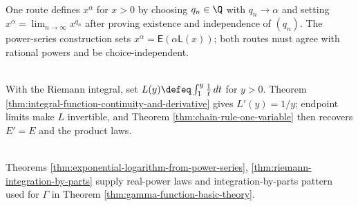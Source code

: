 \begin{perspective} \label{per:real-powers-rational-approximation-route} \\
One route defines $x^\alpha$ for $x>0$ by choosing $q_n\in\Q$ with $q_n\to\alpha$ and setting $x^\alpha=\lim_{n\to\infty}x^{q_n}$ after proving existence and independence of $(q_n)$. The power-series construction sets $x^\alpha=\mathsf{E}(\alpha\mathsf{L}(x))$; both routes must agree with rational powers and be choice-independent.
\end{perspective}

\begin{perspective} \label{per:ross-logarithmic-integral-route} \\
With the Riemann integral, set $L(y)\defeq\int_1^y \frac1t\,dt$ for $y>0$. Theorem \ref{thm:integral-function-continuity-and-derivative} gives $L'(y)=1/y$; endpoint limits make $L$ invertible, and Theorem \ref{thm:chain-rule-one-variable} then recovers $E'=E$ and the product laws.
\end{perspective}

\begin{perspective} \label{per:exponential-factorial-and-improper-integrals} \\
Theorems \ref{thm:exponential-logarithm-from-power-series}, \ref{thm:riemann-integration-by-parts} supply real-power laws and integration-by-parts pattern used for $\Gamma$ in Theorem \ref{thm:gamma-function-basic-theory}.
\end{perspective}

